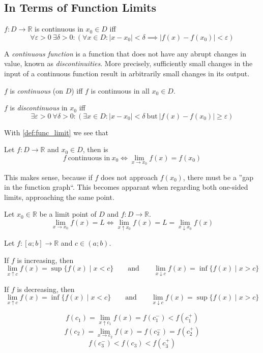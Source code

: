 \subsection{In Terms of Function Limits}
\begin{definition}\label{def:eps_delt_cont}
   \(f: D \to \mathbb{R}\) is continuous in \(x_0 \in D\) iff
   \[\forall \varepsilon > 0~\exists \delta > 0: (\forall x \in D: |x-x_0| < \delta \implies |f(x) - f(x_0)| < \varepsilon)\]
\end{definition}
\begin{remark}[Intuition]
   A \emph{continuous function} is a function that does not have any abrupt changes in value, known as \emph{discontinuities}.
   More precisely, sufficiently small changes in the input of a continuous function result in arbitrarily small changes in its output.
\end{remark}
\begin{remark}[Terminology]
   \(f\) is \emph{continuous} (on \(D\)) iff \(f\) is continuous in all \(x_0 \in D\).

   \(f\) is \emph{discontinuous} in \(x_0\) iff
   \[\exists \varepsilon > 0~\forall \delta > 0: (\exists x \in D: |x - x_0| < \delta~\text{but}~|f(x) - f(x_0)| \geq \varepsilon)\]
\end{remark}
With \cref{def:func_limit} we see that
\begin{theorem}
   Let \(f: D \to \mathbb{R}\) and \(x_0 \in D\), then is
   \[f~\text{continuous in}~x_0 \iff \lim_{x \to x_0} f(x) = f(x_0)\]
\end{theorem}
This makes sense, because if \(f\) does not approach \(f(x_0)\), there must be a ''gap in the function graph``.
This becomes apparant when regarding both one-sided limits, approaching the same point.
\begin{theorem}
   Let \(x_0 \in \mathbb{R}\) be a limit point of \(D\) and \(f: D \to \mathbb{R}\).
   \[\lim_{x \to x_0} f(x) = L \iff \lim_{x \uparrow x_0} f(x) = L = \lim_{x \downarrow x_0} f(x)\]
\end{theorem}

\begin{proposition}\label{pro:one_sided_lim_incr}
   Let \(f: [a; b] \to \mathbb{R}\) and \(c \in (a; b)\).

   If \(f\) is increasing, then
   \[\lim_{x \uparrow c} f(x) = \sup\{f(x) \mid x < c\} \qquad\text{and}\qquad \lim_{x \downarrow c} f(x) = \inf\{f(x) \mid x > c\}\]

   If \(f\) is decreasing, then
   \[\lim_{x \uparrow c} f(x) = \inf\{f(x) \mid x < c\} \qquad\text{and}\qquad \lim_{x \downarrow c} f(x) = \sup\{f(x) \mid x > c\}\]
\end{proposition}
\begin{example}
   \[f(c_1) = \lim_{x \uparrow c_1} f(x) = f(c_1^-) < f(c_1^+)\]
   \[f(c_2) = \lim_{x \to c_2} f(x) = f(c_2^-) = f(c_2^+)\]
   \[f(c_3^-) < f(c_3) < f(c_3^+)\]
\end{example}
\begin{center}
   
\end{center}


